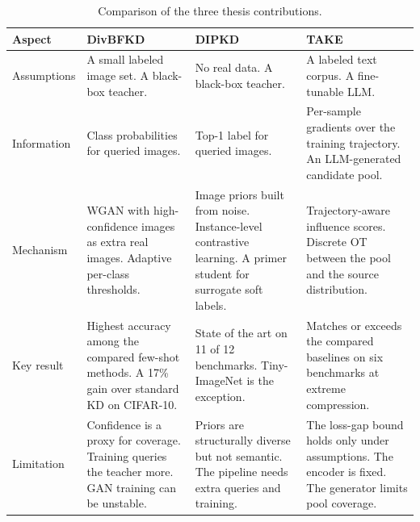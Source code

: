 \documentclass[12pt, a4paper, twoside]{book}
\numberwithin{equation}{chapter}
\theoremstyle{plain}
\theoremstyle{definition}
\theoremstyle{remark}
\begin{document}
\begin{table}[ht]
  \centering
  \begin{threeparttable}
    \caption{Comparison of the three thesis contributions.}
    \label{tab:contributions-comparison}
    \setlength{\tabcolsep}{8pt}
    \begin{tabular}{>{\raggedright\arraybackslash}p{2.1cm} >{\raggedright\arraybackslash}p{3.8cm} >{\raggedright\arraybackslash}p{3.8cm} >{\raggedright\arraybackslash}p{3.8cm}}
      \toprule
      \textbf{Aspect} & DivBFKD & DIPKD & TAKE \\
      \midrule
      Assumptions
        & A small labeled image set. A black-box teacher.
        & No real data. A black-box teacher.
        & A labeled text corpus. A fine-tunable \ac{LLM}. \\
      \addlinespace
      Information
        & Class probabilities for queried images.
        & Top-1 label for queried images.
        & Per-sample gradients over the training trajectory. An \ac{LLM}-generated candidate pool. \\
      \addlinespace
      Mechanism
        & WGAN with high-confidence images as extra real images. Adaptive per-class thresholds.
        & Image priors built from noise. Instance-level contrastive learning. A primer student for surrogate soft labels.
        & Trajectory-aware influence scores. Discrete \ac{OT} between the pool and the source distribution. \\
      \addlinespace
      Key result
        & Highest accuracy among the compared few-shot methods. A 17\% gain over standard \ac{KD} on CIFAR-10.
        & State of the art on 11 of 12 benchmarks. Tiny-ImageNet is the exception.
        & Matches or exceeds the compared baselines on six benchmarks at extreme compression. \\
      \addlinespace
      Limitation
        & Confidence is a proxy for coverage. Training queries the teacher more. GAN training can be unstable.
        & Priors are structurally diverse but not semantic. The pipeline needs extra queries and training.
        & The loss-gap bound holds only under assumptions. The encoder is fixed. The generator limits pool coverage. \\
      \bottomrule
    \end{tabular}
  \end{threeparttable}
\end{table}
\end{document}
